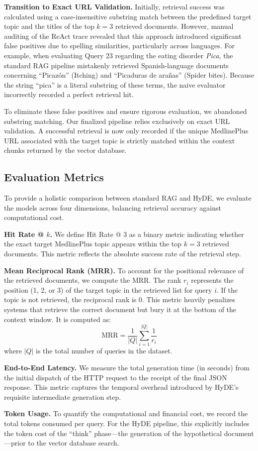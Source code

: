 \textbf{Transition to Exact URL Validation.}
Initially, retrieval success was calculated using a case-insensitive substring match between the predefined target topic and the titles of the top $k=3$ retrieved documents. However, manual auditing of the ReAct trace revealed that this approach introduced significant false positives due to spelling similarities, particularly across languages. For example, when evaluating Query 23 regarding the eating disorder \textit{Pica}, the standard RAG pipeline mistakenly retrieved Spanish-language documents concerning ``Picaz\'{o}n'' (Itching) and ``Picaduras de ara\~{n}as'' (Spider bites). Because the string ``pica'' is a literal substring of these terms, the naive evaluator incorrectly recorded a perfect retrieval hit.

To eliminate these false positives and ensure rigorous evaluation, we abandoned substring matching. Our finalized pipeline relies exclusively on exact URL validation. A successful retrieval is now only recorded if the unique MedlinePlus URL associated with the target topic is strictly matched within the context chunks returned by the vector database.

\subsection{Evaluation Metrics}
To provide a holistic comparison between standard RAG and HyDE, we evaluate the models across four dimensions, balancing retrieval accuracy against computational cost.

\noindent\textbf{Hit Rate @ $k$.} We define Hit Rate @ 3 as a binary metric indicating whether the exact target MedlinePlus topic appears within the top $k=3$ retrieved documents. This metric reflects the absolute success rate of the retrieval step.

\noindent\textbf{Mean Reciprocal Rank (MRR).} To account for the positional relevance of the retrieved documents, we compute the MRR. The rank $r_i$ represents the position (1, 2, or 3) of the target topic in the retrieved list for query $i$. If the topic is not retrieved, the reciprocal rank is 0. This metric heavily penalizes systems that retrieve the correct document but bury it at the bottom of the context window. It is computed as:
$$ \text{MRR} = \frac{1}{|Q|} \sum_{i=1}^{|Q|} \frac{1}{r_i} $$
where $|Q|$ is the total number of queries in the dataset.

\noindent\textbf{End-to-End Latency.} We measure the total generation time (in seconds) from the initial dispatch of the HTTP request to the receipt of the final JSON response. This metric captures the temporal overhead introduced by HyDE's requisite intermediate generation step.

\noindent\textbf{Token Usage.} To quantify the computational and financial cost, we record the total tokens consumed per query. For the HyDE pipeline, this explicitly includes the token cost of the ``think'' phase—the generation of the hypothetical document—prior to the vector database search.